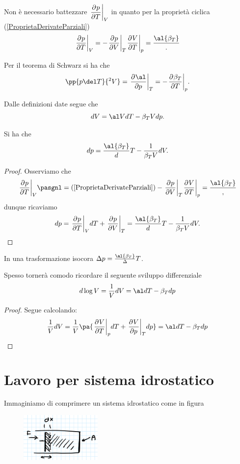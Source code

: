 \begin{remark}
Non \`e necessario battezzare $\displaystyle\ppb TpV$ in quanto per la propriet\`a ciclica (\ref{ProprietaDerivateParziali})
\[\ppb TpV=-\ppb VpT\ppb TVp=\frac\al{\beta_T}.\]
\end{remark}

\begin{remark}
Per il teorema di Schwarz si ha che
\[\pp{p\del T}{^2V}=\ppb p\al T=-\ppb T{\beta_T}p.\]
\end{remark}

\begin{remark}
Dalle definizioni date segue che
\[dV=\al VdT-\beta_T Vdp.\]
\end{remark}

\begin{proposition}\label{DifferenzialePressione}
Si ha che
\[dp=\frac\al{\beta_T}dT-\frac1{\beta_T V}dV.\]
\end{proposition}
\begin{proof}
Osserviamo che
\[\ppb TpV\pasgnl={(\ref{ProprietaDerivateParziali})}-\ppb VpT \ppb TVp=\frac \al{\beta_T},\]
dunque ricaviamo
\[dp=\ppb TpVdT+\ppb VpT=\frac\al{\beta_T}dT-\frac1{\beta_T V}dV.\]
\end{proof}
\begin{corollary}
In una trasformazione isocora $\Delta p=\frac\al{\beta_T}\Delta T$.
\end{corollary}

\begin{remark}\label{DifferenzialeLogaritmicoNelVolume}
Spesso torner\`a comodo ricordare il seguente sviluppo differenziale
\[d\log V=\frac1VdV=\al dT-\beta_T dp\]
\end{remark}
\begin{proof}
Segue calcolando:
\[\frac1VdV=\frac1V\pa{\ppb TVp dT+\ppb pVTdp}=\al dT-\beta_T dp\]
\end{proof}

\section{Lavoro per sistema idrostatico}
Immaginiamo di comprimere un sistema idrostatico come in figura 

\begin{figure}[!htb]
	\centering
	\includegraphics[width=4cm]{images/Lavoro_In_Idrostatico.png}
\end{figure}


